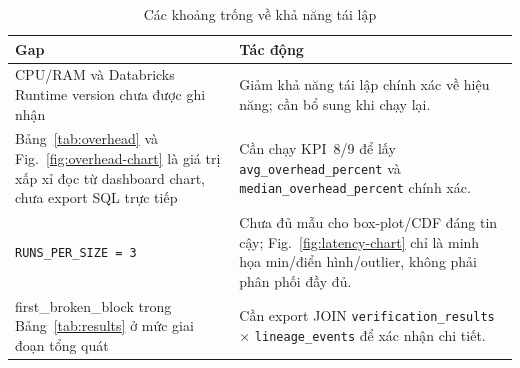 \begin{table}[H]
\centering
\caption{Các khoảng trống về khả năng tái lập}
\label{tab:repro-gaps}
\begin{tabular}{|p{4cm}|p{3.7cm}|}
\hline
\textbf{Gap} & \textbf{Tác động} \\
\hline
CPU/RAM và Databricks Runtime version chưa được ghi nhận & Giảm khả năng tái lập chính xác về hiệu năng; cần bổ sung khi chạy lại. \\
\hline
Bảng~\ref{tab:overhead} và Fig.~\ref{fig:overhead-chart} là giá trị xấp xỉ đọc từ dashboard chart, chưa export SQL trực tiếp & Cần chạy KPI~8/9 để lấy \texttt{avg\_overhead\_percent} và \texttt{median\_overhead\_percent} chính xác. \\
\hline
\texttt{RUNS\_PER\_SIZE = 3} & Chưa đủ mẫu cho box-plot/CDF đáng tin cậy; Fig.~\ref{fig:latency-chart} chỉ là minh họa min/điển hình/outlier, không phải phân phối đầy đủ. \\
\hline
first\_broken\_block trong Bảng~\ref{tab:results} ở mức giai đoạn tổng quát & Cần export JOIN \texttt{verification\_results} $\times$ \texttt{lineage\_events} để xác nhận chi tiết. \\
\hline
\end{tabular}
\end{table}
